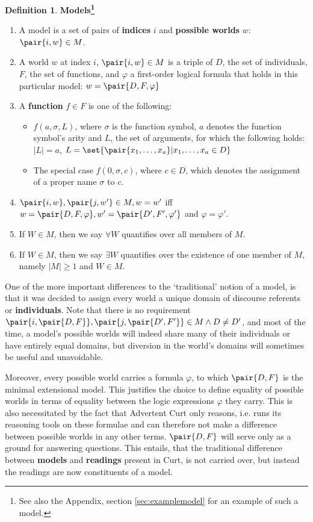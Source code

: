 \documentclass[a4paper]{article}
\newcommand{\stress}{\textbf} %
\newcommand{\term}[1]{\textsf{\textbf{#1}}} %
\newcommand{\pn}{\textsf} %
\newcommand{\curt}{\pn{Curt}}
\newcommand{\acurt}{\pn{Advertent Curt}}
\theoremstyle{remark}
\theoremstyle{remark}
\theoremstyle{definition}
\newtheorem{definition}[thm]{Definition}
\theoremstyle{definition}
\begin{document}
\begin{definition}\label{Models}
  \stress{Models\footnote{See also the Appendix, section \ref{sec:examplemodel}
  for an example of such a model.}}
  \begin{enumerate}
    \item A model is a set of pairs of \term{indices} $i$ and \term{possible
    worlds} $w$: $\pair{i,w} \in M$. 
    \item A world $w$ at index $i$, $\pair{i,w} \in M$ is a triple of $D$, the set
    of individuals, $F$, the set of functions, and $\varphi$ a first-order
    logical formula that holds in this particular model: $w = \pair{D,F,\varphi}$
    \item A \term{function} $f \in F$ is one of the following: 
    \begin{itemize}
      \item $f(a,\sigma,L)$, where $\sigma$ is the function symbol, $a$ denotes
      the function symbol's arity and $L$, the set of arguments, for which the
      following holds: $|L| = a$,
      $L = \set{\pair{x_1,\ldots{},x_a}|x_1,\ldots{},x_a \in D}$
      \item The special case $f(0,\sigma,c)$, where $c \in D$, which denotes the
      assignment of a proper name $\sigma$ to $c$.
    \end{itemize}
    \item $\pair{i,w}, \pair{j,w'} \in M, w = w'$ iff $w = \pair{D,F,\varphi}, w' =
    \pair{D',F',\varphi'}$ and $\varphi = \varphi'$.
    \item If $W \in M$, then we say $\forall W$ quantifies over all members of $M$.
    \item If $W \in M$, then we say $\exists W$ quantifies over the existence of
    one member of $M$, namely $|M| \geq 1$ and $W \in M$.
  \end{enumerate}
\end{definition}

One of the more important differences to the `traditional' notion of a model, is
that it was decided to assign every world a unique domain of discourse referents
or \term{individuals}. Note that there is no requirement $\pair{i,\pair{D,F}},
\pair{j,\pair{D',F'}} \in M \wedge D\neq D'$, and most of the time, a model's
possible worlds will indeed share many of their individuals or have entirely
equal domains, but diversion in the world's domains will sometimes be useful and
unavoidable.

Moreover, every possible world carries a formula $\varphi$, to which $\pair{D,F}$
is the minimal extensional model. This justifies the choice to define equality
of possible worlds in terms of equality between the logic expressions $\varphi$
they carry. This is also necessitated by the fact that \acurt{}  only reasons,
i.e. runs its reasoning tools on these formulae and can therefore not make a
difference between possible worlds in any other terms. $\pair{D,F}$ will serve
only as a ground for answering questions. This entails, that the traditional
difference between \term{models} and \term{readings} present in \curt, is not
carried over, but instead the readings are now constituents of a model.
\end{document}
